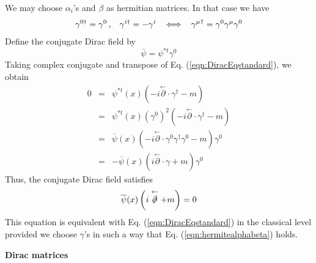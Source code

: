 We may choose $\alpha_i$'s and $\beta$ as hermitian matrices.
In that case we have
\begin{eqnarray}
\gamma^{0\dagger} = \gamma^0\,,
\hspace{3mm}
\gamma^{i\dagger} = - \gamma^i
\hspace{3mm}
\Longleftrightarrow
\hspace{3mm}
{\gamma^\mu}^\dagger = \gamma^0 \gamma^\mu \gamma^0
\label{eqn:hermitealphabeta}
\end{eqnarray}
Define the conjugate Dirac field by
\begin{equation}
\overline{\psi} = \psi^{*t} \gamma^0
\label{eqn:DefConjDiracField}
\end{equation}
Taking complex conjugate and transpose of Eq. (\ref{eqn:DiracEqstandard}), we obtain
\begin{eqnarray}
0 &=&  
\psi^{*t}(x) 
\left( -i \stackrel{\leftarrow}{\partial} \cdot \gamma^\dagger - m \right) 
\nonumber\\
&=&
\psi^{*t}(x) (\gamma^0)^2
\left( -i \stackrel{\leftarrow}{\partial} \cdot \gamma^\dagger - m \right) 
\nonumber\\
&=&
\overline{\psi}(x)
\left( -i \stackrel{\leftarrow}{\partial} \cdot \gamma^0\gamma^\dagger \gamma^0 - m \right) \gamma^0
\nonumber\\
&=&
- \overline{\psi}(x)
\left( i \stackrel{\leftarrow}{\partial} \cdot \gamma  + m \right) \gamma^0
\nonumber
\end{eqnarray}
Thus, the conjugate Dirac field satisfies
\begin{eqnarray}
\overline{\psi}(x)
\left( i \stackrel{\leftarrow}{\slashed{\partial}}  + m \right)
= 0
\end{eqnarray}
This equation is equivalent with Eq. (\ref{eqn:DiracEqstandard}) in the classical level
provided we choose $\gamma$'s in such a way that Eq. (\ref{eqn:hermitealphabeta}) holds.

\bigskip
\noindent
{\bf Dirac matrices}

